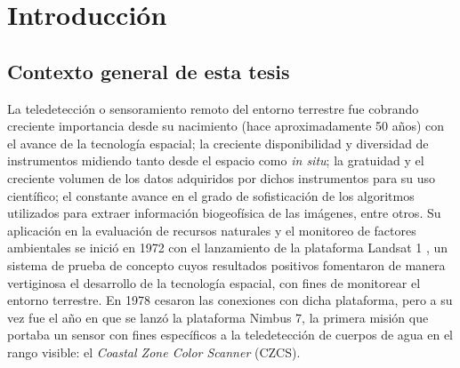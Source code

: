 \chapter{Introducción}
\label{int}

\section{Contexto general de esta tesis}
\label{int:s:contexto}

    La teledetección o sensoramiento remoto del entorno terrestre fue cobrando creciente importancia desde su nacimiento (hace aproximadamente 50 años) con el avance de la tecnología espacial; la creciente disponibilidad y diversidad de instrumentos midiendo tanto desde el espacio como \textit{in situ}; la gratuidad y el creciente volumen de los datos adquiridos por dichos instrumentos para su uso científico; el constante avance en el grado de sofisticación de los algoritmos utilizados para extraer información biogeofísica de las imágenes, entre otros. Su aplicación en la evaluación de recursos naturales y el monitoreo de factores ambientales se inició en 1972 con el lanzamiento de la plataforma Landsat 1 \cite{landsat1}, un sistema de prueba de concepto cuyos resultados positivos fomentaron de manera vertiginosa el desarrollo de la tecnología espacial, con fines de monitorear el entorno terrestre. En 1978 cesaron las conexiones con dicha plataforma, pero a su vez fue el año en que se lanzó la plataforma Nimbus 7, la primera misión que portaba un sensor con fines específicos a la teledetección de cuerpos de agua en el rango visible: el \textit{Coastal Zone Color Scanner} (CZCS).
    
